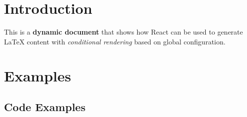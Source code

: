 \documentclass{article}
\begin{document}
\section{Introduction}
This is a \textbf{dynamic document} that shows how React can be used to generate LaTeX content with \textit{conditional rendering} based on global configuration.


\section{Examples}
\subsection{Code Examples}
\end{document}
